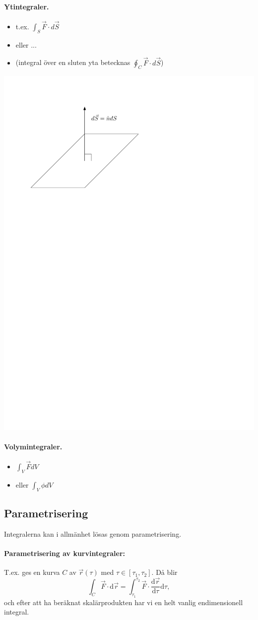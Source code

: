 \documentclass[%
oneside,                 %
final,                   %
10pt]{article}
\begin{document}
\noindent
\paragraph{Ytintegraler.}
\begin{itemize}
\item t.ex. $\int_S \vec{F} \cdot d\vec{S}$

\item eller ...

\item (integral över en sluten yta betecknas $\oint_C \vec{F} \cdot d\vec{S}$)
\end{itemize}

\noindent
\vspace{6mm}

\centerline{\includegraphics[width=0.4\linewidth]{fig/yta.pdf}}

\vspace{6mm}



\paragraph{Volymintegraler.}
\begin{itemize}
\item $\int_V \vec{F} dV$

\item eller $\int_V \phi dV$
\end{itemize}

\noindent
\subsection*{Parametrisering}
Integralerna kan i allmänhet lösas genom parametrisering. 

\paragraph{Parametrisering av kurvintegraler:}
T.ex. ges en kurva $C$ av $\vec{r}(\tau)$ med $\tau \in [\tau_1,\tau_2]$. Då blir
\begin{equation}
  \int_C \vec{F}\cdot \mbox{d}\vec{r} = \int_{\tau_1}^{\tau_2} \vec{F}
\cdot \frac{\mbox{d}\vec{r}}{\mbox{d}\tau} \mbox{d}\tau,
\end{equation}
och efter att ha beräknat skalärprodukten har vi en helt vanlig endimensionell integral.
\end{document}
